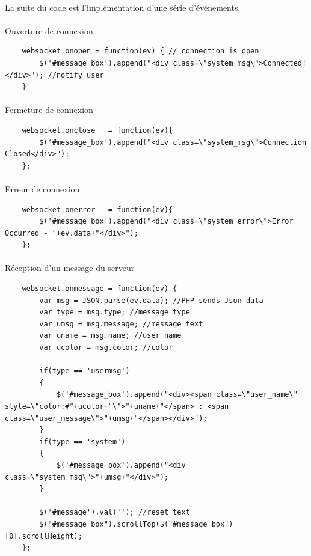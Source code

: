 \documentclass[a4paper,12pt]{report}
\begin{document}
	\paragraph*{}
	La suite du code est l'implémentation d'une série d'événements.
	\paragraph*{}
	Ouverture de connexion
	\begin{lstlisting}
	websocket.onopen = function(ev) { // connection is open 
		$('#message_box').append("<div class=\"system_msg\">Connected!</div>"); //notify user
	}
	\end{lstlisting}	
	\paragraph*{}
	Fermeture de connexion
	\begin{lstlisting}
	websocket.onclose 	= function(ev){
		$('#message_box').append("<div class=\"system_msg\">Connection Closed</div>");
	}; 
	\end{lstlisting}	
	\paragraph*{}
	Erreur de connexion
	\begin{lstlisting}
	websocket.onerror	= function(ev){ 
		$('#message_box').append("<div class=\"system_error\">Error Occurred - "+ev.data+"</div>");
	}; 
	\end{lstlisting}	
	\paragraph*{}
	Réception d'un message du serveur
	\begin{lstlisting}
	websocket.onmessage = function(ev) {
		var msg = JSON.parse(ev.data); //PHP sends Json data
		var type = msg.type; //message type
		var umsg = msg.message; //message text
		var uname = msg.name; //user name
		var ucolor = msg.color; //color

		if(type == 'usermsg') 
		{
			$('#message_box').append("<div><span class=\"user_name\" style=\"color:#"+ucolor+"\">"+uname+"</span> : <span class=\"user_message\">"+umsg+"</span></div>");
		}
		if(type == 'system')
		{
			$('#message_box').append("<div class=\"system_msg\">"+umsg+"</div>");
		}
		
		$('#message').val(''); //reset text
		$("#message_box").scrollTop($("#message_box")[0].scrollHeight);
	};
	\end{lstlisting}	
\end{document}

